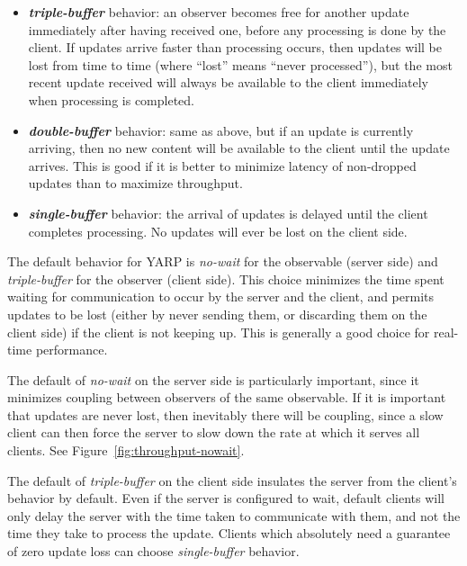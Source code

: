 \begin{itemize} \pflist

\item \textbf{\textit{triple-buffer}} behavior: an observer becomes free for
another update immediately after having received one, before any
processing is done by the client.  If updates arrive faster than
processing occurs, then updates will be lost from time to time (where
``lost'' means ``never processed''), but the most recent update
received will always be available to the client immediately when processing
is completed.

\item \textbf{\textit{double-buffer}} behavior: same as above, but if
an update is currently arriving, then no new content will be available
to the client until the update arrives.  This is good if it is better
to minimize latency of non-dropped updates than to maximize
throughput.

\item \textbf{\textit{single-buffer}} behavior: the arrival of updates
is delayed until the client completes processing.  No updates will ever be 
lost on the client side.


\end{itemize}

\noindent The default behavior for YARP is \textit{no-wait} for
the observable (server side) and \textit{triple-buffer} for 
the observer (client side).  This
choice minimizes the time spent waiting for communication to occur by
the server and the client, and permits updates to be lost (either by
never sending them, or discarding them on the client side) if the
client is not keeping up.  This is generally a good choice for
real-time performance.

The default of \textit{no-wait} on the server side is particularly
important, since it minimizes coupling between observers of the same
observable.  If it is important that updates are never lost, then
inevitably there will be coupling, since a slow client can then force
the server to slow down the rate at which it serves all clients.
See Figure~\ref{fig:throughput-nowait}.

The default of \textit{triple-buffer} on the client side insulates the
server from the client's behavior by default.  Even if the server is
configured to wait, default clients will only delay the server
with the time taken to communicate with them, and not the time
they take to process the update.  Clients which absolutely
need a guarantee of zero update loss can choose \textit{single-buffer}
behavior.
%


